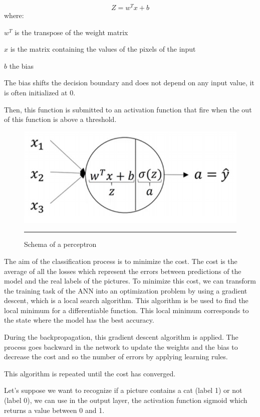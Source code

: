 \begin{equation}
Z=w^T x + b
\end{equation}
where:

$w^T$ is the transpose of the weight matrix 

$x$ is the matrix containing the values of the pixels of the input  

$b$  the bias 

The bias shifts the decision boundary and does not depend on any input value, it is often initialized at 0.

Then, this function is submitted to an activation function that fire when the out of this function is above a threshold.

\begin{figure}[htbp]
  \centering
    \includegraphics[width=\textwidth]{Figures/Perceptron.png}
    \rule{35em}{0.5pt}
  \caption[Schema of a perceptron]{Schema of a perceptron}
  \label{fig:Perceptron}
\end{figure}

The aim of the classification process is to minimize the cost. The cost is the average of all the losses which represent the errors between predictions of the model and the real labels of the pictures.
To minimize this cost, we can transform the training task of the ANN into an optimization problem by using a gradient descent, which is a local search algorithm. This algorithm is be used to find the local minimum for a differentiable function. This local minimum corresponds to the state where the model has the best accuracy. 

During the backpropagation, this gradient descent algorithm is applied. The process goes backward in the network to update the weights and the bias to decrease the cost and so the number of errors by applying learning rules. 

This algorithm is repeated until the cost has converged.

Let's suppose we want to recognize if a picture contains a cat (label 1) or not (label 0), we can use in the output layer, the activation function sigmoid which returns a value between 0 and 1.

